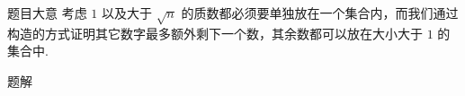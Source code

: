\begin{frame}{题目大意}
	考虑 $1$ 以及大于 $\sqrt{n}$ 的质数都必须要单独放在一个集合内，而我们通过构造的方式证明其它数字最多额外剩下一个数，其余数都可以放在大小大于 $1$ 的集合中.
\end{frame}

\begin{frame}{题解}

	
\end{frame}